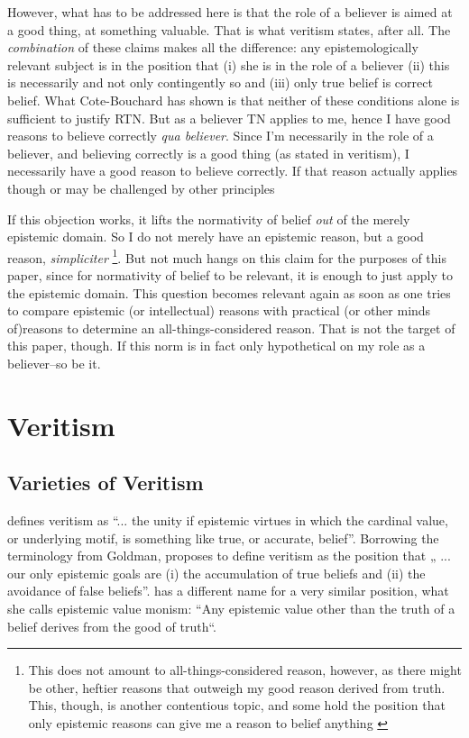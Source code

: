 \documentclass[12pt,numbers=noenddot]{scrartcl}
\begin{document}
However, what has to be addressed here is that the role of a believer is aimed at a good thing, at something valuable. That is what veritism states, after all. The \emph{combination} of these claims makes all the difference: any epistemologically relevant subject is in the position that (i) she is in the role of a believer (ii) this is necessarily and not only contingently so and (iii) only true belief is correct belief. What Cote-Bouchard has shown is that neither of these conditions alone is sufficient to justify RTN. But as a believer TN applies to me, hence I have good reasons to believe correctly \emph{qua believer}. Since I'm necessarily in the role of a believer, and believing correctly is a good thing (as stated in veritism), I necessarily have a good reason to believe correctly. If that reason actually applies though or may be challenged by other principles 

If this objection works, it lifts the normativity of belief \emph{out} of the merely epistemic domain. So I do not merely have an epistemic reason, but a good reason, \emph{simpliciter}
\footnote{This does not amount to all-things-considered reason, however, as there might be other, heftier reasons that outweigh my good reason derived from truth. This, though, is another contentious topic, and some hold the position that only epistemic reasons can give me a reason to belief anything \autocite{Kelly2003-KELERA}}.
But not much hangs on this claim for the purposes of this paper, since for normativity of belief to be relevant, it is enough to just apply to the epistemic domain. This question becomes relevant again as soon as one tries to compare epistemic (or intellectual) reasons with practical (or other minds of)reasons to determine an all-things-considered reason. That is not the target of this paper, though. If this norm is in fact  only hypothetical on my role as a believer–so be it.

\section{Veritism}
\subsection{Varieties of Veritism}\label{sec:varieties}

\textcite[54]{Goldman2002-GOLTUO-2} defines veritism as  “... the unity if epistemic virtues in which the cardinal value, or underlying motif, is something like true, or accurate, belief”. Borrowing the terminology from Goldman, \textcite[360]{Berker2013-BERETA-2} proposes to define veritism as the position that „ ... our only epistemic goals are (i) the accumulation of true beliefs and (ii) the avoidance of false beliefs”. \textcite{Zagzebski2004-ZAGEVM-2} has a different name for a very similar position, what she calls epistemic value monism: “Any epistemic value other than the truth of a belief derives from the good of truth“. 
\end{document}
